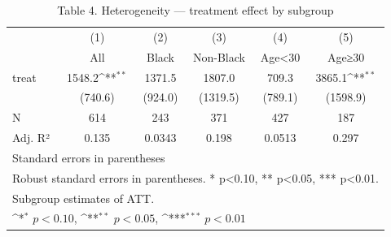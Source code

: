 \begin{table}[htbp]\centering
\def\sym#1{\ifmmode^{#1}\else\(^{#1}\)\fi}
\caption{Table 4. Heterogeneity — treatment effect by subgroup}
\begin{tabular}{l*{5}{c}}
\toprule
            &\multicolumn{1}{c}{(1)}&\multicolumn{1}{c}{(2)}&\multicolumn{1}{c}{(3)}&\multicolumn{1}{c}{(4)}&\multicolumn{1}{c}{(5)}\\
            &\multicolumn{1}{c}{All}&\multicolumn{1}{c}{Black}&\multicolumn{1}{c}{Non-Black}&\multicolumn{1}{c}{Age<30}&\multicolumn{1}{c}{Age≥30}\\
\midrule
treat       &      1548.2\sym{**} &      1371.5         &      1807.0         &       709.3         &      3865.1\sym{**} \\
            &     (740.6)         &     (924.0)         &    (1319.5)         &     (789.1)         &    (1598.9)         \\
\midrule
N           &         614         &         243         &         371         &         427         &         187         \\
Adj. R²     &       0.135         &      0.0343         &       0.198         &      0.0513         &       0.297         \\
\bottomrule
\multicolumn{6}{l}{\footnotesize Standard errors in parentheses}\\
\multicolumn{6}{l}{\footnotesize Robust standard errors in parentheses. * p<0.10, ** p<0.05, *** p<0.01.}\\
\multicolumn{6}{l}{\footnotesize Subgroup estimates of ATT.}\\
\multicolumn{6}{l}{\footnotesize \sym{*} \(p<0.10\), \sym{**} \(p<0.05\), \sym{***} \(p<0.01\)}\\
\end{tabular}
\end{table}
